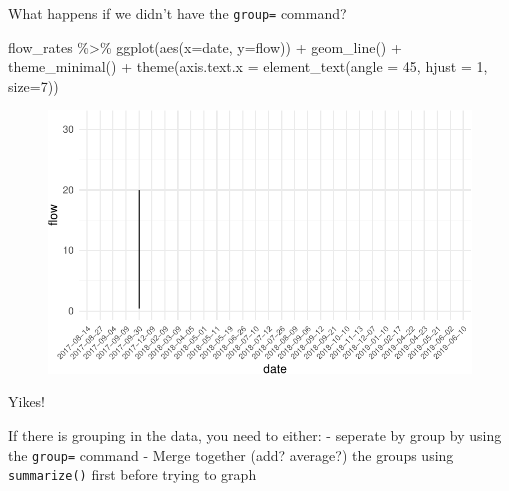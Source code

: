 \documentclass[
  letterpaper,
  DIV=11,
  numbers=noendperiod]{scrartcl}
\newenvironment{Shaded}{\begin{snugshade}}{\end{snugshade}}
\newcommand{\AttributeTok}[1]{\textcolor[rgb]{0.40,0.45,0.13}{#1}}
\newcommand{\DecValTok}[1]{\textcolor[rgb]{0.68,0.00,0.00}{#1}}
\newcommand{\FunctionTok}[1]{\textcolor[rgb]{0.28,0.35,0.67}{#1}}
\newcommand{\NormalTok}[1]{\textcolor[rgb]{0.00,0.23,0.31}{#1}}
\newcommand{\SpecialCharTok}[1]{\textcolor[rgb]{0.37,0.37,0.37}{#1}}
\begin{document}
\begin{tcolorbox}[enhanced jigsaw, arc=.35mm, title=\textcolor{quarto-callout-warning-color}{\faExclamationTriangle}\hspace{0.5em}{Warning}, left=2mm, leftrule=.75mm, toptitle=1mm, opacitybacktitle=0.6, colframe=quarto-callout-warning-color-frame, coltitle=black, opacityback=0, breakable, toprule=.15mm, bottomtitle=1mm, titlerule=0mm, colback=white, rightrule=.15mm, bottomrule=.15mm, colbacktitle=quarto-callout-warning-color!10!white]

What happens if we didn't have the \texttt{group=} command?

\begin{Shaded}
\begin{Highlighting}[]
\NormalTok{flow\_rates }\SpecialCharTok{\%\textgreater{}\%} 
  \FunctionTok{ggplot}\NormalTok{(}\FunctionTok{aes}\NormalTok{(}\AttributeTok{x=}\NormalTok{date, }\AttributeTok{y=}\NormalTok{flow)) }\SpecialCharTok{+} 
  \FunctionTok{geom\_line}\NormalTok{() }\SpecialCharTok{+} 
  \FunctionTok{theme\_minimal}\NormalTok{() }\SpecialCharTok{+}
  \FunctionTok{theme}\NormalTok{(}\AttributeTok{axis.text.x =} \FunctionTok{element\_text}\NormalTok{(}\AttributeTok{angle =} \DecValTok{45}\NormalTok{, }\AttributeTok{hjust =} \DecValTok{1}\NormalTok{, }\AttributeTok{size=}\DecValTok{7}\NormalTok{))}
\end{Highlighting}
\end{Shaded}

\begin{figure}[H]

{\centering \includegraphics{118_F_ggplot2_files/figure-pdf/unnamed-chunk-10-1.pdf}

}

\end{figure}

Yikes!

If there is grouping in the data, you need to either: - seperate by
group by using the \texttt{group=} command - Merge together (add?
average?) the groups using \texttt{summarize()} first before trying to
graph

\end{tcolorbox}
\end{document}
